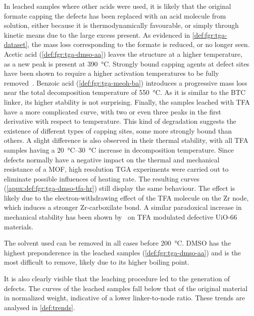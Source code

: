 In leached samples where other acids were used,
it is likely that the original formate capping the defects 
has been replaced with an acid molecule from solution,
either because it is thermodynamically favourable, or simply through 
kinetic means due to the large excess present.
As evidenced in \autoref{def:fgr:tga-dataset}, the mass 
loss corresponding to the formate is reduced, or no longer seen. 
Acetic acid (\autoref{def:fgr:tga-dmso-aa}) leaves the 
structure at a higher temperature, as
a new peak is present at \SI{390}{\degreeCelsius}. Strongly
bound capping agents at defect sites have been shown to 
require a higher activation temperatures to be fully
removed~\cite{jiaoHeatTreatmentDefectiveUiO662017}.
Benzoic acid (\autoref{def:fgr:tga-meoh-ba}) introduces a progressive 
mass loss near the total decomposition temperature 
of \SI{550}{\degreeCelsius}.
As it is similar to the BTC linker, its higher stability
is not surprising. Finally, the samples leached with 
TFA have a more complicated curve, with two or even 
three peaks in the first derivative with respect to temperature.
This kind of degradation suggests the existence of different types
of capping sites, some more strongly bound than others.
A slight difference is also observed in their thermal stability,
with all TFA samples having a \SIrange{20}{30}{\degreeCelsius}
increase in decomposition temperature. Since defects normally
have a negative impact on the thermal and mechanical resistance 
of a MOF, high resolution TGA experiments were carried out
to eliminate possible influences of heating rate. The resulting
curves (\autoref{appx:def:fgr:tga-dmso-tfa-hr}) still display 
the same behaviour. The effect is likely due to the
electron-withdrawing effect of the TFA molecule on the Zr 
node, which induces a stronger Zr-carboxilate bond. A similar
paradoxical increase in mechanical stability has been shown 
by~\citet{vandevoordeImprovingMechanicalStability2015} on 
TFA modulated defective UiO-66 materials.

The solvent used can be removed in all cases before 
\SI{200}{\degreeCelsius}. DMSO has the highest
preponderence in the leached samples (\autoref{def:fgr:tga-dmso-aa}) 
and is the most difficult to remove, likely due to its higher boiling point.

It is also clearly visible that the leaching procedure
led to the generation of defects. The curves 
of the leached samples fall below that of the original material
in normalized weight, indicative of a lower linker-to-node ratio.
These trends are analysed in \autoref{def:trends}.
